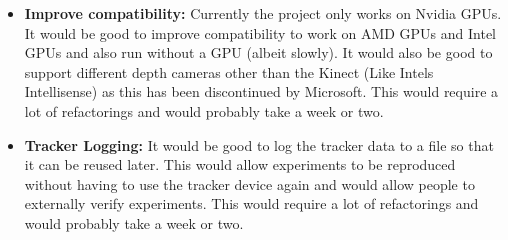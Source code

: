 \begin{itemize}
    \item \textbf{Improve compatibility:} Currently the project only works on Nvidia GPUs. It would be good to improve compatibility to work on AMD GPUs and Intel GPUs and also run without a GPU (albeit slowly). It would also be good to support different depth cameras other than the Kinect (Like Intels Intellisense) as this has been discontinued by Microsoft. This would require a lot of refactorings and would probably take a week or two.

    \item \textbf{Tracker Logging:} It would be good to log the tracker data to a file so that it can be reused later. This would allow experiments to be reproduced without having to use the tracker device again and would allow people to externally verify experiments. This would require a lot of refactorings and would probably take a week or two.
\end{itemize}